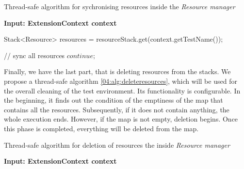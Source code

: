 \begin{algorithm}[H]
    \label{04:alg:syncresources}
    \caption{Thread-safe algorithm for sychronising resources inside the \emph{Resource manager}}
    \hspace*{\algorithmicindent} \textbf{Input: ExtensionContext context}
    \begin{algorithmic}[1]
        \State Stack<Resource> resources = resourceStack.get(context.getTestName());
        \State

        \State // sync all resources
            \State $continue;$
        \EndIf

        \State

        \EndForEach
    \end{algorithmic}
\end{algorithm}

Finally, we have the last part, that is deleting resources from the stacks.
We propose a thread-safe algorithm \ref{04:alg:deleteresources}, which will be used for the overall cleaning of the test environment.
Its functionality is configurable.
In the beginning, it finds out the condition of the emptiness of the map that contains all the resources.
Subsequently, if it does not contain anything, the whole execution ends.
However, if the map is not empty, deletion begins.
Once this phase is completed, everything will be deleted from the map.

\begin{algorithm}[H]
    \label{04:alg:deleteresources}
    \caption{Thread-safe algorithm for deletion of resources the inside \emph{Resource manager}}
    \hspace*{\algorithmicindent} \textbf{Input: ExtensionContext context}
    \begin{algorithmic}[1]

        \If{$\Psi$}
        \EndIf
        \While {$!\Psi$}
        \EndWhile

    \end{algorithmic}
\end{algorithm}

